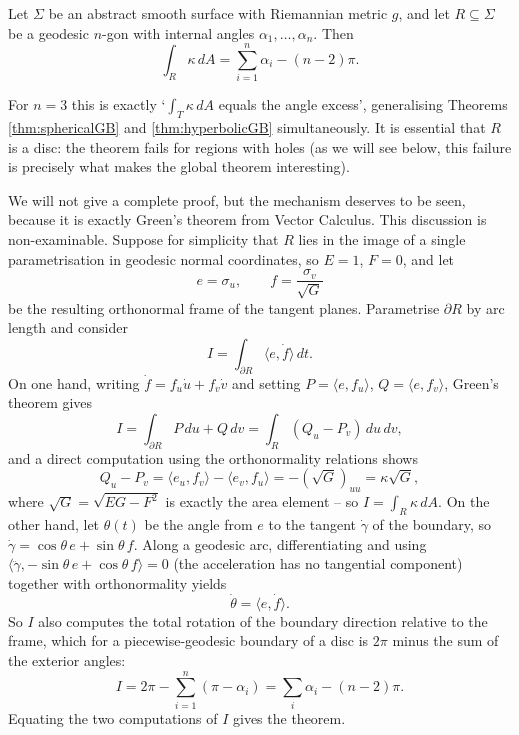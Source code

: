 \documentclass[a4paper]{scrartcl}
\begin{document}
\begin{theorem}\label{thm:localGB}
    Let $\Sigma$ be an abstract smooth surface with Riemannian metric $g$, and let $R \subseteq \Sigma$ be a geodesic $n$-gon with internal angles $\alpha_1, \dots, \alpha_n$. Then
    $$
    \int_R \kappa \, dA = \sum_{i=1}^n \alpha_i - (n - 2)\pi.
    $$
\end{theorem}

For $n = 3$ this is exactly `$\int_T \kappa \, dA$ equals the angle excess', generalising Theorems \ref{thm:sphericalGB} and \ref{thm:hyperbolicGB} simultaneously. It is essential that $R$ is a disc: the theorem fails for regions with holes (as we will see below, this failure is precisely what makes the global theorem interesting).

We will not give a complete proof, but the mechanism deserves to be seen, because it is exactly Green's theorem from Vector Calculus. This discussion is non-examinable. Suppose for simplicity that $R$ lies in the image of a single parametrisation in geodesic normal coordinates, so $E = 1$, $F = 0$, and let
$$
e = \sigma_u, \qquad f = \frac{\sigma_v}{\sqrt{G}}
$$
be the resulting orthonormal frame of the tangent planes. Parametrise $\partial R$ by arc length and consider
$$
I = \int_{\partial R} \langle e, \dot f \rangle \, dt.
$$
On one hand, writing $\dot f = f_u \dot u + f_v \dot v$ and setting $P = \langle e, f_u \rangle$, $Q = \langle e, f_v \rangle$, Green's theorem gives
$$
I = \int_{\partial R} P \, du + Q \, dv = \int_R (Q_u - P_v) \, du\, dv,
$$
and a direct computation using the orthonormality relations shows
$$
Q_u - P_v = \langle e_u, f_v \rangle - \langle e_v, f_u \rangle = -(\sqrt{G})_{uu} = \kappa \sqrt{G},
$$
where $\sqrt{G} = \sqrt{EG - F^2}$ is exactly the area element -- so $I = \int_R \kappa \, dA$.
On the other hand, let $\theta(t)$ be the angle from $e$ to the tangent $\dot\gamma$ of the boundary, so $\dot\gamma = \cos\theta\, e + \sin\theta \, f$. Along a geodesic arc, differentiating and using $\langle \ddot\gamma, -\sin\theta \, e + \cos\theta\, f \rangle = 0$ (the acceleration has no tangential component) together with orthonormality yields
$$
\dot\theta = \langle e, \dot f\rangle.
$$
So $I$ also computes the total rotation of the boundary direction relative to the frame, which for a piecewise-geodesic boundary of a disc is $2\pi$ minus the sum of the exterior angles:
$$
I = 2\pi - \sum_{i=1}^n (\pi - \alpha_i) = \sum_i \alpha_i - (n - 2)\pi.
$$
Equating the two computations of $I$ gives the theorem.
\end{document}
